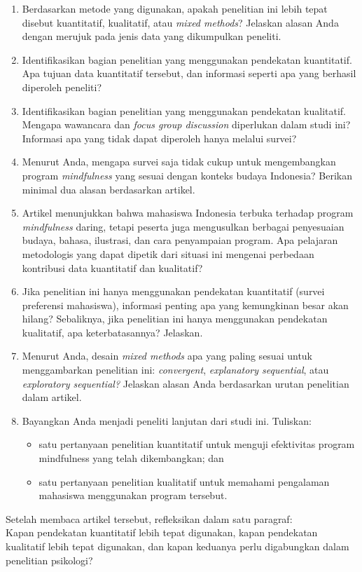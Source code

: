 \documentclass[
  indonesian,
  letterpaper,
  DIV=11,
  numbers=noendperiod]{scrreprt}
\providecommand{\tightlist}{%
  \setlength{\itemsep}{0pt}\setlength{\parskip}{0pt}}
\begin{document}
\begin{tcolorbox}
\begin{enumerate}
\def\labelenumi{\arabic{enumi}.}
\tightlist
\item
  Berdasarkan metode yang digunakan, apakah penelitian ini lebih tepat
  disebut kuantitatif, kualitatif, atau \emph{mixed methods}? Jelaskan
  alasan Anda dengan merujuk pada jenis data yang dikumpulkan peneliti.
\item
  Identifikasikan bagian penelitian yang menggunakan pendekatan
  kuantitatif. Apa tujuan data kuantitatif tersebut, dan informasi
  seperti apa yang berhasil diperoleh peneliti?
\item
  Identifikasikan bagian penelitian yang menggunakan pendekatan
  kualitatif. Mengapa wawancara dan \emph{focus group discussion}
  diperlukan dalam studi ini? Informasi apa yang tidak dapat diperoleh
  hanya melalui survei?
\item
  Menurut Anda, mengapa survei saja tidak cukup untuk mengembangkan
  program \emph{mindfulness} yang sesuai dengan konteks budaya
  Indonesia? Berikan minimal dua alasan berdasarkan artikel.
\item
  Artikel menunjukkan bahwa mahasiswa Indonesia terbuka terhadap program
  \emph{mindfulness} daring, tetapi peserta juga mengusulkan berbagai
  penyesuaian budaya, bahasa, ilustrasi, dan cara penyampaian program.
  Apa pelajaran metodologis yang dapat dipetik dari situasi ini mengenai
  perbedaan kontribusi data kuantitatif dan kualitatif?
\item
  Jika penelitian ini hanya menggunakan pendekatan kuantitatif (survei
  preferensi mahasiswa), informasi penting apa yang kemungkinan besar
  akan hilang? Sebaliknya, jika penelitian ini hanya menggunakan
  pendekatan kualitatif, apa keterbatasannya? Jelaskan.
\item
  Menurut Anda, desain \emph{mixed methods} apa yang paling sesuai untuk
  menggambarkan penelitian ini: \emph{convergent}, \emph{explanatory
  sequential}, atau \emph{exploratory sequential?} Jelaskan alasan Anda
  berdasarkan urutan penelitian dalam artikel.
\item
  Bayangkan Anda menjadi peneliti lanjutan dari studi ini. Tuliskan:

  \begin{itemize}
  \item
    satu pertanyaan penelitian kuantitatif untuk menguji efektivitas
    program mindfulness yang telah dikembangkan; dan
  \item
    satu pertanyaan penelitian kualitatif untuk memahami pengalaman
    mahasiswa menggunakan program tersebut.
  \end{itemize}
\end{enumerate}

Setelah membaca artikel tersebut, refleksikan dalam satu paragraf:\\
Kapan pendekatan kuantitatif lebih tepat digunakan, kapan pendekatan
kualitatif lebih tepat digunakan, dan kapan keduanya perlu digabungkan
dalam penelitian psikologi?

\end{tcolorbox}
\end{document}
